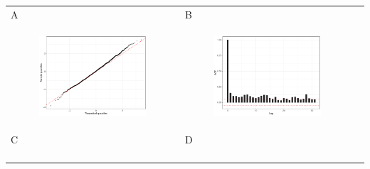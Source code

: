 \documentclass[11pt]{article}
\begin{document}
\begin{suppfigure}[ht]
	\begin{tabular}{lll}
	A&B\\
	\begin{subfigure}[t]{0.49\linewidth}
		\centering
		\includegraphics[width=1\linewidth]{figs/supp-figure-2a.pdf} 
	\end{subfigure}&
	\begin{subfigure}[t]{0.49\linewidth}
		\centering
		\includegraphics[width=1\linewidth]{figs/supp-figure-2b.pdf}
	\end{subfigure}&\\
	C&D\\
	\begin{subfigure}[t]{0.49\linewidth}

\end{subfigure}
\end{tabular}
\end{suppfigure}
\end{document}
